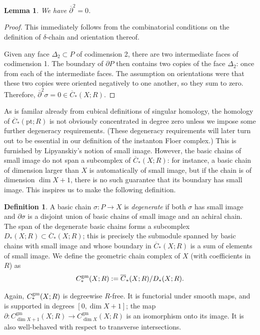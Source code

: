 \documentclass[10pt,a4paper]{amsart}
\newtheorem{lemma}[theorem]{Lemma}
\theoremstyle{definition}
\newtheorem{definition}[theorem]{Definition}
\theoremstyle{remark}
\numberwithin{figure}{qchap}
\begin{document}
\begin{lemma}We have $\overline \partial^2 = 0$.
\end{lemma}

\begin{proof}This immediately follows from the combinatorial conditions on the definition of $\delta$-chain and orientation thereof.

Given any face $\Delta_2 \subset P$ of codimension 2, there are two intermediate faces of codimension 1. The boundary of $\partial P$ then contains two copies of the face $\Delta_2$: once from each of the intermediate faces. The assumption on orientations were that these two copies were oriented negatively to one another, so they sum to zero. Therefore, $\overline\partial^2 \sigma = 0 \in \overline C_*(X;R)$. 
\end{proof}

As is familar already from cubical definitions of singular homology, the homology of $\overline C_*(\text{pt};R)$ is not obviously concentrated in degree zero unless we impose some further degeneracy requirements. (These degeneracy requirements will later turn out to be essential in our definition of the instanton Floer complex.) This is furnished by Lipyanskiy's notion of small image. However, the basic chains of small image do not span a subcomplex of $\overline C_*(X;R)$: for instance, a basic chain of dimension larger than $X$ is automatically of small image, but if the chain is of dimension $\dim X + 1$, there is no such guarantee that its boundary has small image. This inspires us to make the following definition.

\begin{definition}\label{degeneracy}A basic chain $\sigma: P \to X$ is \emph{degenerate} if both $\sigma$ has small image and $\partial \sigma$ is a disjoint union of basic chains of small image and an achiral chain. The span of the degenerate basic chains forms a subcomplex $D_*(X;R) \subset \overline C_*(X;R)$; this is precisely the submodule spanned by basic chains with small image and whose boundary in $\overline C_*(X;R)$ is a sum of elements of small image. We define the geometric chain complex of $X$ (with coefficients in $R$) as $$C_*^{\textup{gm}}(X;R) := \overline C_*(X;R)/D_*(X;R).$$
\end{definition}

Again, $C_*^{\textup{gm}}(X;R)$ is degreewise $R$-free. It is functorial under smooth maps, and is supported in degrees $[0, \dim X + 1]$; the map $\partial: C^{\text{gm}}_{\dim X + 1}(X;R) \to C^{\text{gm}}_{\dim X}(X;R)$ is an isomorphism onto its image. It is also well-behaved with respect to transverse intersections.
\end{document}
